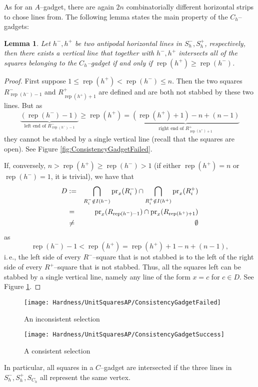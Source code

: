 \documentclass[12pt]{article}
\newtheorem{lemma}[definition]{Lemma}
\newcommand{\rep}{\operatorname{rep}}
\begin{document}
As for an $A$--gadget, there are again $2n$ combinatorially different horizontal strips to chose lines from. The following lemma states the main property of the $C_h$--gadgets:
\begin{lemma}\label{Lemma:ConsistencyLemma} Let $h^-, h^+$ be two antipodal horizontal lines in $S_h^-, S_h^+$, respectively, then there exists a vertical line that together with $h^-, h^+$ intersects all of the squares belonging to the $C_h$--gadget if and only if $\rep(h^+) \geq \rep(h^-)$.
\end{lemma}
\begin{proof}
First suppose $1 \leq \rep(h^+) < \rep(h^-) \leq n$. Then the two squares $R_{\rep(h^-) - 1}^-$ and $R_{\rep(h^+) + 1}^+$ are defined and are both not stabbed by these two lines. But as 
\[ \underbrace{(\rep(h^-) - 1)}_{\text{left end of } R_{\rep(h^-) - 1}^-} \geq \rep(h^+)
 = \underbrace{(\rep(h^+) + 1) - n + (n-1)}_{\text{right end of } R_{\rep(h^+) + 1}^+} \]
they cannot be stabbed by a single vertical line (recall that the squares are open). See Figure \ref{fig:ConsistencyGadgetFailed}.

If, conversely, $n > \rep(h^+) \geq \rep(h^-) > 1$ (if either $\rep(h^+) = n$ or $\rep(h^-) = 1$, it is trivial), we have that
\begin{eqnarray*} 
D & :=   & \bigcap_{R_i^- \notin I(h^-)}\pr_x(R_i^-) \cap \bigcap_{R_i^+ \notin I(h^+)}\pr_x(R_i^+) \\
  & =    & \pr_x(R_{\rep(h^-) - 1}) \cap \pr_x(R_{\rep(h^+) + 1}) \\
  & \neq & \emptyset
\end{eqnarray*}
as 
\[ \rep(h^-) - 1 < \rep(h^+) = \rep(h^+) + 1 - n + (n-1), \] 
i.\,e., the left side of every $R^-$--square that is not stabbed is to the left of the right side of every $R^+$--square that is not stabbed. Thus, all the squares left can be stabbed by a single vertical line, namely any line of the form $x = c$ for $c \in D$. See Figure \ref{fig:ConsistencyGadgetSuccess}. 
\end{proof}

\begin{figure}
	\begin{minipage}[t]{0.5\textwidth}
		\centering \texttt{[image: Hardness/UnitSquaresAP/ConsistencyGadgetFailed]}
		\caption{An inconsistent selection}
		\label{fig:ConsistencyGadgetFailed}
	\end{minipage}\begin{minipage}[t]{0.5\textwidth}
		\centering \texttt{[image: Hardness/UnitSquaresAP/ConsistencyGadgetSuccess]}
		\caption{A consistent selection}
		\label{fig:ConsistencyGadgetSuccess}
	\end{minipage}
\end{figure} 
In particular, all squares in a $C$--gadget are intersected if the three lines in $S_h^-, S_h^+, S_{C_h}$ all represent the same vertex.
\end{document}
